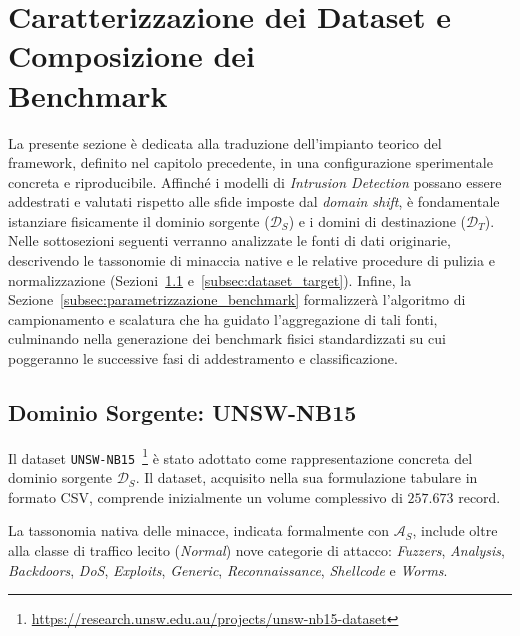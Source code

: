 \section[Caratterizzazione dei Dataset e Composizione dei Benchmark]{Caratterizzazione dei Dataset e Composizione dei \\ Benchmark}
\label{sec:dataset_caratterizzazione}

La presente sezione è dedicata alla traduzione dell'impianto teorico del framework, definito nel capitolo precedente, in una configurazione sperimentale concreta e riproducibile. 
Affinché i modelli di \textit{Intrusion Detection} possano essere addestrati e valutati rispetto alle sfide imposte dal \textit{domain shift}, è fondamentale istanziare fisicamente il dominio sorgente ($\mathcal{D}_S$) e i domini di destinazione ($\mathcal{D}_T$). 
Nelle sottosezioni seguenti verranno analizzate le fonti di dati originarie, descrivendo le tassonomie di minaccia native e le relative procedure di pulizia e normalizzazione (Sezioni~\ref{subsec:dataset_source} e~\ref{subsec:dataset_target}). 
Infine, la Sezione~\ref{subsec:parametrizzazione_benchmark} formalizzerà l'algoritmo di campionamento e scalatura che ha guidato l'aggregazione di tali fonti, culminando nella generazione dei benchmark fisici standardizzati su cui poggeranno le successive fasi di addestramento e classificazione.

\subsection{Dominio Sorgente: UNSW-NB15}
\label{subsec:dataset_source}

Il dataset \texttt{UNSW-NB15}~\cite{nb15}\footnote{\url{https://research.unsw.edu.au/projects/unsw-nb15-dataset}} è stato adottato come rappresentazione concreta del dominio sorgente $\mathcal{D}_S$. 
Il dataset, acquisito nella sua formulazione tabulare in formato CSV, comprende inizialmente un volume complessivo di $257.673$ record. 

La tassonomia nativa delle minacce, indicata formalmente con $\mathcal{A}_S$, include oltre alla classe di traffico lecito (\textit{Normal}) nove categorie di attacco: \textit{Fuzzers}, \textit{Analysis}, \textit{Backdoors}, \textit{DoS}, \textit{Exploits}, \textit{Generic}, \textit{Reconnaissance}, \textit{Shellcode} e \textit{Worms}.

